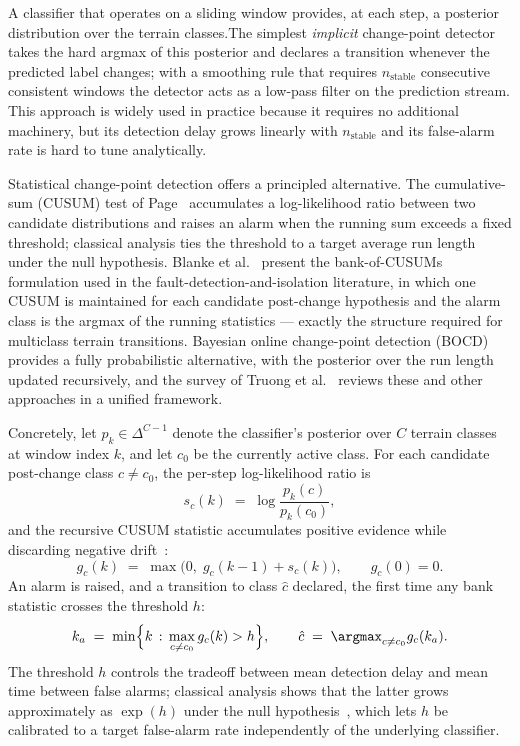 A classifier that operates on a sliding window provides, at each step, a posterior distribution over the terrain classes.The simplest \emph{implicit} change-point detector takes the hard argmax of this posterior and declares a transition whenever the predicted label changes; with a smoothing rule that requires $n_{\text{stable}}$ consecutive consistent windows the detector acts as a low-pass filter on the prediction stream. This approach is widely used in practice because it requires no additional machinery, but its detection delay grows linearly with $n_{\text{stable}}$ and its false-alarm rate is hard to tune analytically.

Statistical change-point detection offers a principled alternative. The cumulative-sum (CUSUM) test of Page~\cite{Page1954} accumulates a log-likelihood ratio between two candidate distributions and raises an alarm when the running sum exceeds a fixed threshold; classical analysis ties the threshold to a target average run length under the null hypothesis. Blanke et al.~\cite[\S6.4]{Blanke2003} present the bank-of-CUSUMs formulation used in the fault-detection-and-isolation literature, in which one CUSUM is maintained for each candidate post-change hypothesis and the alarm class is the argmax of the running statistics --- exactly the structure required for multiclass terrain transitions. Bayesian online change-point detection (BOCD)~\cite{Adams2007} provides a fully probabilistic alternative, with the posterior over the run length updated recursively, and the survey of Truong et al.~\cite{Truong2020} reviews these and other approaches in a unified framework.


Concretely, let $p_{k} \in \Delta^{C-1}$ denote the classifier's posterior over $C$ terrain classes at window index $k$, and let $c_{0}$ be the currently active class. For each candidate post-change class $c \neq c_{0}$, the per-step log-likelihood ratio is
\begin{equation}
    s_{c}(k) \;=\; \log \frac{p_{k}(c)}{p_{k}(c_{0})},
    \label{eq:cusum-llr}
\end{equation}
and the recursive CUSUM statistic accumulates positive evidence while discarding negative drift~\cite{Page1954,Blanke2003}:
\begin{equation}
    g_{c}(k) \;=\; \max\!\bigl(0,\;g_{c}(k-1) + s_{c}(k)\bigr),
    \qquad g_{c}(0) = 0.
    \label{eq:cusum-recursion}
\end{equation}
An alarm is raised, and a transition to class $\hat{c}$ declared, the first time any bank statistic crosses the threshold $h$:
\begin{equation}
    k_{a} \;=\; \min\Bigl\{ k \,:\, \max_{c \neq c_{0}} g_{c}(k) > h \Bigr\},
    \qquad
    \hat{c} \;=\; \argmax_{c \neq c_{0}} g_{c}(k_{a}).
    \label{eq:cusum-alarm}
\end{equation}
The threshold $h$ controls the tradeoff between mean detection delay and mean time between false alarms; classical analysis shows that the latter grows approximately as $\exp(h)$ under the null hypothesis~\cite{Page1954,Truong2020}, which lets $h$ be calibrated to a target false-alarm rate independently of the underlying classifier.



